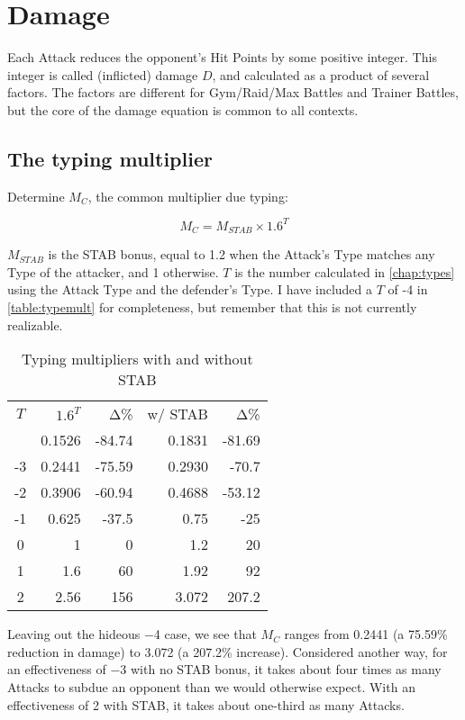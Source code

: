 \chapter{Damage}
\label{chap:damage}
Each Attack reduces the opponent's Hit Points by some positive integer.
This integer is called (inflicted) damage $D$, and calculated as a product of several factors.
The factors are different for Gym/Raid/Max Battles and Trainer Battles,
 but the core of the damage equation is common to all contexts.

\section{The typing multiplier}
\label{sec:typemult}
Determine $M_C$, the common multiplier due typing:

\[ M_C = M_{STAB} \times 1.6^{T} \]

$M_{STAB}$ is the STAB bonus, equal to 1.2 when the Attack's Type matches any
  Type of the attacker, and 1 otherwise.
$T$ is the number calculated in \autoref{chap:types} using the Attack Type
 and the defender's Type.
I have included a $T$ of -4 in \autoref{table:typemult} for completeness,
 but remember that this is not currently realizable.

\begin{table}
\begin{center}
\begin{tabular}{c r r r r}
  $T$ & $1.6^{T}$ & Δ\% & w/ STAB & Δ\% \\
\Midrule
  -4 & 0.1526 & -84.74 & 0.1831 & -81.69 \\
  -3 & 0.2441 & -75.59 & 0.2930 & -70.7 \\
  -2 & 0.3906 & -60.94 & 0.4688 & -53.12 \\
  -1 & 0.625 & -37.5 & 0.75 & -25 \\
  0 & 1 & 0 & 1.2 & 20 \\
  1 & 1.6 & 60 & 1.92 & 92 \\
  2 & 2.56 & 156 & 3.072 & 207.2 \\
\end{tabular}
\caption{Typing multipliers with and without STAB}
\label{table:typemult}
\end{center}
\end{table}

Leaving out the hideous −4 case, we see that $M_C$ ranges
 from 0.2441 (a 75.59\% reduction in damage) to 3.072
 (a 207.2\% increase).
Considered another way, for an effectiveness of −3 with no STAB bonus,
 it takes about four times as many Attacks to subdue an opponent than
 we would otherwise expect.
With an effectiveness of 2 with STAB, it takes about one-third as many Attacks.

